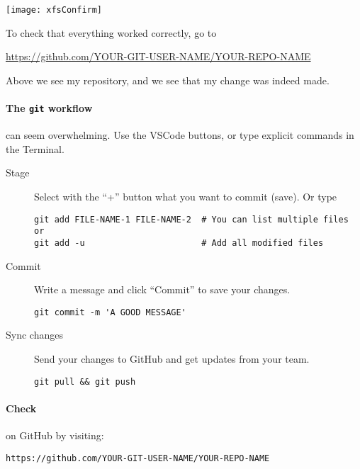 \documentclass{ximera}
\begin{document}
\newpage

\begin{image}
    \texttt{[image: xfsConfirm]}
\end{image}
To check that everything worked correctly, go to
\begin{center}
    \url{https://github.com/YOUR-GIT-USER-NAME/YOUR-REPO-NAME}
\end{center}
Above we see my repository, and we see that my change was indeed made.


\paragraph{The \texttt{git} workflow} can seem overwhelming. Use the VSCode buttons, or type explicit commands in the Terminal.
\begin{description}
    \item[Stage] Select with the ``+'' button what you want to
        commit (save). Or type
{\footnotesize
\begin{verbatim}
git add FILE-NAME-1 FILE-NAME-2  # You can list multiple files or
git add -u                       # Add all modified files 
\end{verbatim}
}
    \item[Commit] Write a message and click ``Commit'' to save
          your changes. 
\begin{verbatim}
git commit -m 'A GOOD MESSAGE'
\end{verbatim}
\pdfOnly{\end{description}}
\pdfOnly{\begin{minipage}{\columnwidth}}
\pdfOnly{\begin{description}}    
    \item[Sync changes] Send your changes to GitHub and get updates from
          your  team.
\begin{verbatim}
git pull && git push
\end{verbatim}
\end{description}
\paragraph{Check} on GitHub by visiting:
\begin{center}
    \verb!https://github.com/YOUR-GIT-USER-NAME/YOUR-REPO-NAME!
\end{center}
\pdfOnly{\end{minipage}}
\pdfOnly{\end{multicols}}



\twocolumn
\end{document}
